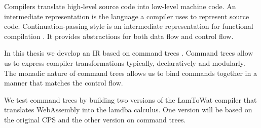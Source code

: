 
Compilers translate high-level source code into low-level machine code. An intermediate representation is the language a compiler uses to represent source code. Continuation-passing style is an intermediate representation for functional compilation \autocite{steele1978rabbit, DBLP:books/daglib/0022396}. It provides abstractions for both data flow and control flow.

In this thesis we develop an IR based on command trees \autocite{commandtreespoulsen}. Command trees allow us to express compiler transformations typically, declaratively and modularly. The monadic nature of command trees allows us to bind commands together in a manner that matches the control flow.

We test command trees by building two versions of the LamToWat compiler that translates WebAssembly into the lamdba calculus. One version will be based on the original CPS and the other version on command trees.